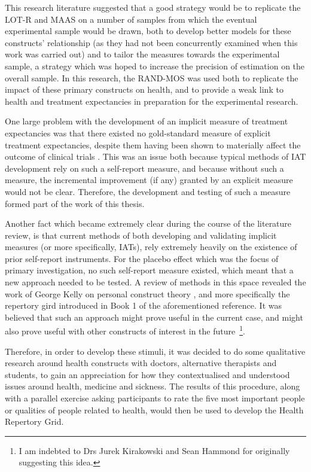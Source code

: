 This research literature suggested that a good strategy would be to replicate the LOT-R and MAAS on a number of samples from which the eventual experimental sample would be drawn, both to develop better models for these constructs' relationship (as they had not been concurrently examined when this work was carried out) and to tailor the measures towards the experimental sample, a strategy which was hoped to increase the precision of estimation on the overall sample. In this research, the RAND-MOS was used both to replicate the impact of these primary constructs on health, and to provide a weak link to health and treatment expectancies in preparation for the experimental research. 

One large problem with the development of an implicit measure of treatment expectancies was that there existed no gold-standard measure of explicit treatment expectancies, despite them having been shown to materially affect the outcome of clinical trials \cite{Linde2007,Bausell2005,Benedetti2005}. This was an issue both because typical methods of IAT development rely on such a self-report measure, and because without such a measure, the incremental improvement (if any) granted by an explicit measure would not be clear. Therefore, the development and testing of such a measure formed part of the work of this thesis. 

Another fact which became extremely clear during the course of the literature review, is that current methods of both developing and validating implicit measures (or more specifically, IATs), rely extremely heavily on the existence of prior self-report instruments. For the placebo effect which was the focus of primary investigation, no such self-report measure existed, which meant that a new approach needed to be tested. A review of methods in this space revealed the work of George Kelly on personal construct theory \cite{Kelly1991}, and more specifically the repertory gird introduced in Book 1 of the aforementioned reference. It was believed that such an approach might prove useful in the current case, and might also prove useful with other constructs of interest in the future~\footnote{I am indebted to Drs Jurek Kirakowski and Sean Hammond for originally suggesting this idea.}.

Therefore, in order to develop these stimuli, it was decided to do some qualitative research around health constructs with doctors, alternative therapists and students, to gain an appreciation for how they contextualised and understood issues around health, medicine and sickness. The results of this procedure, along with a parallel exercise asking participants to rate the five most important people or qualities of people related to health, would then be used to develop the Health Repertory Grid. 

